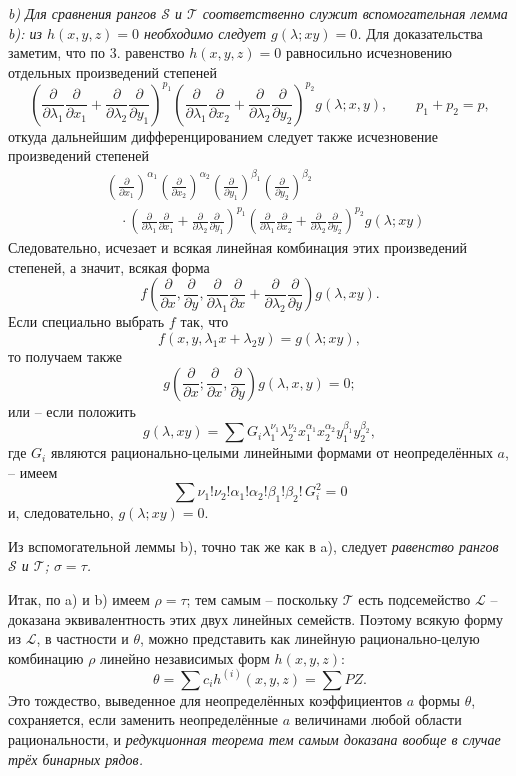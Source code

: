 \documentclass[11pt]{article}
\begin{document}
\emph{b) Для сравнения рангов $\mathcal S$ и $\mathcal T$ соответственно служит вспомогательная лемма b): из $h(x,y,z)=0$ необходимо следует $g(\lambda;xy)=0$.} Для доказательства заметим, что по 3. равенство $h(x,y,z)=0$ равносильно исчезновению отдельных произведений степеней
\[
 \left(\frac{\partial}{\partial\lambda_1}\frac{\partial}{\partial x_1}
 +\frac{\partial}{\partial\lambda_2}\frac{\partial}{\partial y_1}\right)^{p_1}
 \left(\frac{\partial}{\partial\lambda_1}\frac{\partial}{\partial x_2}
 +\frac{\partial}{\partial\lambda_2}\frac{\partial}{\partial y_2}\right)^{p_2}g(\lambda;x,y),
 \qquad p_1+p_2=p,
\]
откуда дальнейшим дифференцированием следует также исчезновение произведений степеней
\[
\begin{aligned}
&\left(\frac{\partial}{\partial x_1}\right)^{\alpha_1}
 \left(\frac{\partial}{\partial x_2}\right)^{\alpha_2}
 \left(\frac{\partial}{\partial y_1}\right)^{\beta_1}
 \left(\frac{\partial}{\partial y_2}\right)^{\beta_2} \\
&\quad\cdot
 \left(\frac{\partial}{\partial\lambda_1}\frac{\partial}{\partial x_1}
 +\frac{\partial}{\partial\lambda_2}\frac{\partial}{\partial y_1}\right)^{p_1}
 \left(\frac{\partial}{\partial\lambda_1}\frac{\partial}{\partial x_2}
 +\frac{\partial}{\partial\lambda_2}\frac{\partial}{\partial y_2}\right)^{p_2}
 g(\lambda;xy)
\end{aligned}
\]
Следовательно, исчезает и всякая линейная комбинация этих произведений степеней, а значит, всякая форма
\[
  f\left(\frac{\partial}{\partial x},\frac{\partial}{\partial y},
  \frac{\partial}{\partial\lambda_1}\frac{\partial}{\partial x}
  +\frac{\partial}{\partial\lambda_2}\frac{\partial}{\partial y}\right)g(\lambda,xy).
\]
Если специально выбрать $f$ так, что
\[
  f(x,y,\lambda_1x+\lambda_2y)=g(\lambda;xy),
\]
то получаем также
\[
  g\left(\frac{\partial}{\partial x};
    \frac{\partial}{\partial x},
    \frac{\partial}{\partial y}\right)g(\lambda,x,y)=0;
\]
или -- если положить
\[
  g(\lambda,xy)=\sum G_i\lambda_1^{\nu_1}\lambda_2^{\nu_2}
  x_1^{\alpha_1}x_2^{\alpha_2}y_1^{\beta_1}y_2^{\beta_2},
\]
где $G_i$ являются рационально-целыми линейными формами от неопределённых $a$, -- имеем
\[
  \sum \nu_1!\nu_2!\alpha_1!\alpha_2!\beta_1!\beta_2!\,G_i^2=0
\]
и, следовательно, $g(\lambda;xy)=0$.

Из вспомогательной леммы b), точно так же как в a), следует \emph{равенство рангов $\mathcal S$ и $\mathcal T$; $\sigma=\tau$.}

Итак, по a) и b) имеем $\rho=\tau$; тем самым -- поскольку $\mathcal T$ есть подсемейство $\mathcal L$ -- доказана эквивалентность этих двух линейных семейств. Поэтому всякую форму из $\mathcal L$, в частности и $\theta$, можно представить как линейную рационально-целую комбинацию $\rho$ линейно независимых форм $h(x,y,z)$:
\[
  \theta=\sum c_i h^{(i)}(x,y,z)=\sum PZ.
\]
Это тождество, выведенное для неопределённых коэффициентов $a$ формы $\theta$, сохраняется, если заменить неопределённые $a$ величинами любой области рациональности, и \emph{редукционная теорема тем самым доказана вообще в случае трёх бинарных рядов.}
\end{document}
